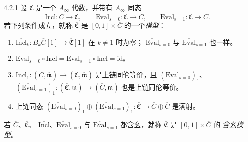 \begin{definition}{4.2.1}\label{def:4-2-1}
设 $\overline{\mathfrak C}$ 是一个 $A_\infty$ 代数，并带有
$A_\infty$ 同态
\[
 \overline{\mathrm{Incl}}\colon\overline C\longrightarrow
 \overline{\mathfrak C},\qquad
 \overline{\mathrm{Eval}}_{s=0}\colon\overline{\mathfrak C}
 \longrightarrow\overline C,\qquad
 \overline{\mathrm{Eval}}_{s=1}\colon\overline{\mathfrak C}
 \longrightarrow\overline C.
\]
若下列条件成立，就称 $\overline{\mathfrak C}$ 是
$[0,1]\times\overline C$ 的一个\emph{模型}：
\begin{enumerate}[label=\textup{(4.2.2.\arabic*)},leftmargin=5.4em]
 \item $\overline{\mathrm{Incl}}_k\colon B_k\overline C[1]
  \to\overline{\mathfrak C}[1]$ 在 $k\ne1$ 时为零；
  $\overline{\mathrm{Eval}}_{s=0}$ 与
  $\overline{\mathrm{Eval}}_{s=1}$ 也一样。
 \item $\overline{\mathrm{Eval}}_{s=0}\circ
  \overline{\mathrm{Incl}}=
  \overline{\mathrm{Eval}}_{s=1}\circ
  \overline{\mathrm{Incl}}=\mathrm{id}$。
 \item $\overline{\mathrm{Incl}}_1\colon
  (\overline C,\overline{\mathfrak m})\to
  (\overline{\mathfrak C},\overline{\mathfrak m})$ 是上链同伦等价，且
  $(\overline{\mathrm{Eval}}_{s=0})_1$、
  $(\overline{\mathrm{Eval}}_{s=1})_1\colon
  (\overline{\mathfrak C},\overline{\mathfrak m})\to
  (\overline C,\overline{\mathfrak m})$ 也是上链同伦等价。
 \item 上链同态
  $(\overline{\mathrm{Eval}}_{s=0})_1\oplus
  (\overline{\mathrm{Eval}}_{s=1})_1\colon
  \overline{\mathfrak C}\to\overline C\oplus\overline C$ 是满射。
\end{enumerate}
若 $\overline C$、$\overline{\mathfrak C}$、
$\overline{\mathrm{Incl}}$、$\overline{\mathrm{Eval}}_{s=0}$ 与
$\overline{\mathrm{Eval}}_{s=1}$ 都含幺，就称
$\overline{\mathfrak C}$ 是 $[0,1]\times\overline C$ 的
\emph{含幺模型}。


\end{definition}
